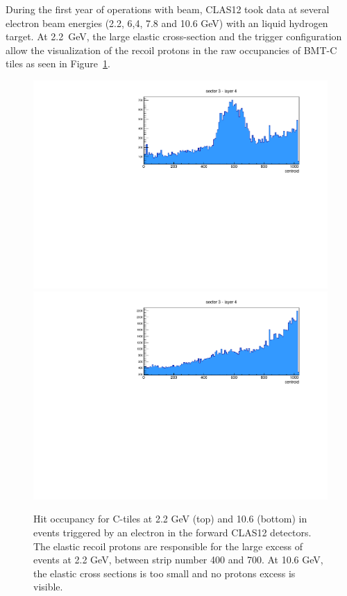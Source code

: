 During the first year of operations with beam, CLAS12 took data at several electron beam energies (2.2, 6,4, 7.8 and 10.6 GeV) with an liquid hydrogen target. At 2.2~GeV, the large elastic cross-section and the trigger configuration allow the visualization of the recoil protons in the raw occupancies of BMT-C tiles as seen in Figure~\ref{fig:mm-occupancy_22_10}. 

\begin{figure}[htb]
 \includegraphics[width=1.0\columnwidth]{images/occupancy2GeV}
 \includegraphics[width=1.0\columnwidth]{images/occupancy10GeV}
 \caption{Hit occupancy for C-tiles at 2.2 GeV (top) and 10.6 (bottom) in events triggered by an electron in the forward CLAS12 detectors. The elastic recoil protons are responsible for the large excess of events at 2.2 GeV, between strip number 400 and 700. At 10.6 GeV, the elastic cross sections is too small and no protons excess is visible.  }
 \label{fig:mm-occupancy_22_10}
\end{figure}

